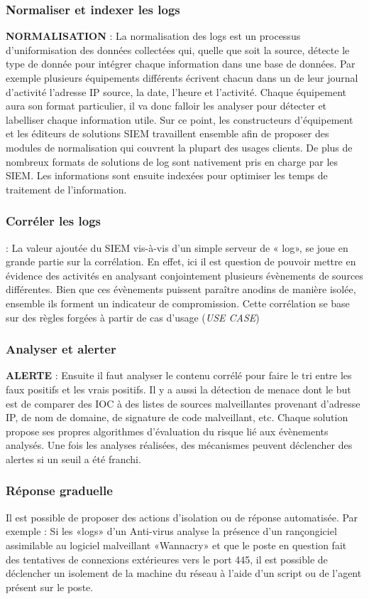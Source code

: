 \subsubsection {Normaliser et indexer les logs}
\textbf{NORMALISATION} : La normalisation des logs est un processus d’uniformisation des données collectées qui, quelle que soit la source, détecte le type de donnée pour intégrer chaque information dans une base de données. Par exemple plusieurs équipements différents écrivent chacun dans un de leur journal d’activité l’adresse IP source, la date, l’heure et l’activité. Chaque équipement aura son format particulier, il va donc falloir les analyser pour détecter et labelliser chaque information utile. Sur ce point, les constructeurs d’équipement et les éditeurs de solutions SIEM travaillent ensemble afin de proposer des modules de normalisation qui couvrent la plupart des usages clients. De plus de nombreux formats de solutions de log sont nativement pris en charge par les SIEM. Les informations sont ensuite indexées pour optimiser les temps de traitement de l’information.
\subsubsection {Corréler les logs}
 : La valeur ajoutée du SIEM vis-à-vis d’un simple serveur de « log», se joue en grande partie sur la corrélation. En effet, ici il est question de pouvoir mettre en évidence des activités en analysant conjointement plusieurs évènements de sources différentes. Bien que ces évènements puissent paraître anodins de manière isolée, ensemble ils forment un indicateur de compromission. Cette corrélation se base sur des règles forgées à partir de cas d’usage (\textit{USE CASE})

\subsubsection {Analyser et alerter}
\textbf{ALERTE} : Ensuite il faut analyser le contenu corrélé pour faire le tri entre les faux positifs et les vrais positifs. Il y a aussi la détection de menace dont le but est de comparer des IOC à des listes de sources malveillantes provenant d’adresse IP, de nom de domaine, de signature de code malveillant, etc. Chaque solution propose ses propres algorithmes d’évaluation du risque lié aux évènements analysés. Une fois les analyses réalisées, des mécanismes peuvent déclencher des alertes si un seuil a été franchi. 
\subsubsection {Réponse graduelle}
Il est possible de proposer des actions d’isolation ou de réponse automatisée. Par exemple : Si les «logs» d’un Anti-virus analyse la présence d’un rançongiciel assimilable au logiciel malveillant «Wannacry» et que le poste en question fait des tentatives de connexions extérieures vers le port 445, il est possible de déclencher un isolement de la machine du réseau à l’aide d’un script ou de l’agent présent sur le poste. 





